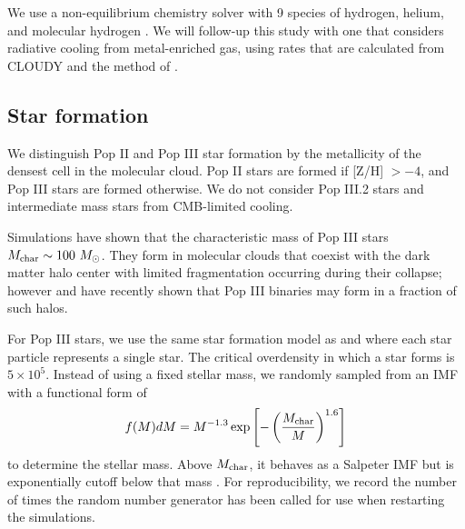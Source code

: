 \documentclass[apjl]{emulateapj}
\begin{document}
We use a non-equilibrium chemistry solver with 9 species of hydrogen,
helium, and molecular hydrogen \citep{Abel97}.  We will follow-up this
study with one that considers radiative cooling from metal-enriched
gas, using rates that are calculated from CLOUDY \citep{CLOUDY} and
the method of \citet{2008MNRAS.385.1443S}.


\subsection{Star formation}

We distinguish Pop II and Pop III star formation by the metallicity of
the densest cell in the molecular cloud.  Pop II stars are formed if
[Z/H] $> -4$, and Pop III stars are formed otherwise.  We do not
consider Pop III.2 stars and intermediate mass stars from CMB-limited
cooling.

Simulations have shown that the characteristic mass of Pop III stars
$M_{\rm char} \sim 100~\Ms$.  They form in molecular clouds that
coexist with the dark matter halo center with limited fragmentation
occurring during their collapse; however \citet{2009Sci...325..601T}
and \citet{Stacy10_Binary} have recently shown that Pop III binaries
may form in a fraction of such halos.


For Pop III stars, we use the same star formation model as
\citet{Abel07} and \citet{Wise08_Gal} where each star particle
represents a single star.  The critical overdensity in which a star
forms is $5 \times 10^5$.  Instead of using a fixed stellar mass, we
randomly sampled from an IMF with a functional form of
%
\begin{equation}
\label{eqn:imf}
f(M)dM = M^{-1.3} \exp\left[-\left(\frac{M_{\rm char}}{M}\right)^{1.6}\right]
\end{equation}
to determine the stellar mass.  Above $M_{\rm char}$, it behaves as a
Salpeter IMF but is exponentially cutoff below that mass
\citep{Chabrier03, Clark09}.  For reproducibility, we record the
number of times the random number generator \citep[Mersenne
  twister;][]{MTwister} has been called for use when restarting the
simulations.
\end{document}
